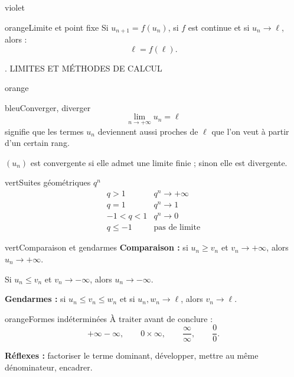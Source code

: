 \documentclass[11pt,a4paper]{article}
\newcommand{\Un}{\ensuremath{(u_n)}}
\newcommand{\tagcol}[2]{\begin{tcolorbox}[enhanced,colback=#1!11,colframe=#1!45!black,boxrule=0.42pt,arc=2mm,left=1mm,right=1mm,top=0.45mm,bottom=0.45mm,before skip=0mm,after skip=0.85mm,fontupper=\bfseries\scriptsize,colupper=#1!55!black]\centering #2\end{tcolorbox}}
\begin{document}
\begin{landscape}
\begin{minipage}[t]{0.242\linewidth}
\begin{panel}{violet}
\begin{fichebox}{orange}{Limite et point fixe}
Si $u_{n+1}=f(u_n)$, si $f$ est continue et si $u_n\to \ell$, alors :
\[
\ell=f(\ell).
\]
\end{fichebox}


\end{panel}
\end{minipage}
\hfill
\begin{minipage}[t]{0.242\linewidth}
\tagcol{orange}{4. LIMITES ET MÉTHODES DE CALCUL}
\begin{panel}{orange}

\begin{fichebox}{bleu}{Converger, diverger}
\[
\lim_{n\to+\infty}u_n=\ell
\]
signifie que les termes $u_n$ deviennent aussi proches de $\ell$ que l'on veut à partir d'un certain rang.

\medskip
\Un{} est convergente si elle admet une limite finie ; sinon elle est divergente.
\end{fichebox}

\begin{fichebox}{vert}{Suites géométriques $q^n$}
\[
\begin{array}{c|c}
q>1 & q^n\to +\infty\\
q=1 & q^n\to 1\\
-1<q<1 & q^n\to 0\\
q\leq -1 & \text{pas de limite}
\end{array}
\]
\end{fichebox}

\begin{fichebox}{vert}{Comparaison et gendarmes}
\textbf{Comparaison :} si $u_n\geq v_n$ et $v_n\to +\infty$, alors $u_n\to +\infty$.

\medskip
Si $u_n\leq v_n$ et $v_n\to -\infty$, alors $u_n\to -\infty$.

\medskip
\textbf{Gendarmes :} si $u_n\leq v_n\leq w_n$ et si $u_n,w_n\to \ell$, alors $v_n\to \ell$.
\end{fichebox}

\begin{fichebox}{orange}{Formes indéterminées}
À traiter avant de conclure :
\[
+\infty-\infty,
\qquad 0\times\infty,
\qquad \frac{\infty}{\infty},
\qquad \frac{0}{0}.
\]

\medskip
\textbf{Réflexes :} factoriser le terme dominant, développer, mettre au même dénominateur, encadrer.
\end{fichebox}


\end{panel}
\end{minipage}


\end{landscape}
\clearpage
\restoregeometry
\pagecolor{white}\color{black}
\pagestyle{fancy}
\end{document}
